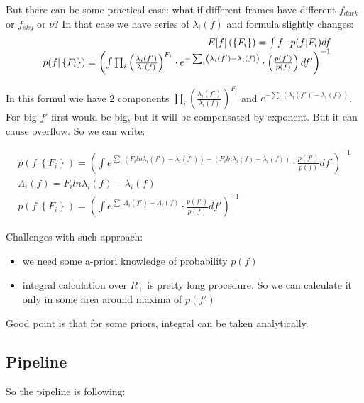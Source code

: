 \documentclass{article}
\begin{document}
But there can be some practical case: what if different frames have different $f_{dark}$ or $f_{sky}$ or $\nu$? In that case we have series
of $\lambda_i(f)$ and formula slightly changes:
\begin{equation}
\begin{array}{r@{}l}
    E[f]\left( \left\{ F_i \right\} \right) = \int f \cdot p(f | {F_i}) df \\
    p(f | \left\{ F_i \right\}) = \left( \int \prod_i \left( \frac{\lambda_i(f')}{\lambda_i(f)} \right)^{F_i} \cdot 
    e^{-\sum_i \left(\lambda_i(f')-\lambda_i(f)\right)} \cdot \left( \frac{p(f')}{p(f)} \right) df'\right)^{-1}
\end{array}
\end{equation}

In this formul wie have 2 components $\prod_i \left( \frac{\lambda_i(f')}{\lambda_i(f)} \right)^{F_i}$ and
$e^{-\sum_i \left(\lambda_i(f')-\lambda_i(f)\right)}$. For big $f'$ first would be big, but it will be compensated by exponent.
But it can cause overflow. So we can write:

\begin{eqnarray}
    p(f | \left\{ F_i \right\}) = \left( \int e^{\sum_i \left( F_i ln \lambda_i(f') - \lambda_i(f')\right) 
            - \left( F_i ln \lambda_i(f) - \lambda_i(f)\right)} \cdot \frac{p(f')}{p(f)} df' \right)^{-1} \label{eq:bayes3} \\[9pt]
    \Lambda_i(f) = F_i ln \lambda_i(f) - \lambda_i(f) \\[9pt]
    p(f | \left\{ F_i \right\}) = \left( \int e^{\sum_i \Lambda_i(f') - \Lambda_i(f) }\cdot \frac{p(f')}{p(f)} df' \right)^{-1}
\end{eqnarray}



Challenges with such approach:
\begin{itemize}
\item we need some a-priori knowledge of probability $p(f)$
\item integral calculation over $R_{+}$ is pretty long procedure. So we can calculate it only in some area around maxima of $p(f')$
\end{itemize}

Good point is that for some priors, integral can be taken analytically.

\subsection{Pipeline}
So the pipeline is following:
\end{document}
